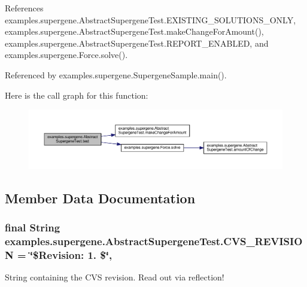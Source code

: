 References examples.\-supergene.\-Abstract\-Supergene\-Test.\-E\-X\-I\-S\-T\-I\-N\-G\-\_\-\-S\-O\-L\-U\-T\-I\-O\-N\-S\-\_\-\-O\-N\-L\-Y, examples.\-supergene.\-Abstract\-Supergene\-Test.\-make\-Change\-For\-Amount(), examples.\-supergene.\-Abstract\-Supergene\-Test.\-R\-E\-P\-O\-R\-T\-\_\-\-E\-N\-A\-B\-L\-E\-D, and examples.\-supergene.\-Force.\-solve().



Referenced by examples.\-supergene.\-Supergene\-Sample.\-main().



Here is the call graph for this function\-:
\nopagebreak
\begin{figure}[H]
\begin{center}
\leavevmode
\includegraphics[width=350pt]{classexamples_1_1supergene_1_1_abstract_supergene_test_a92f6bbeeedeed872a2cb7cb38e6a40c2_cgraph}
\end{center}
\end{figure}




\subsection{Member Data Documentation}
\hypertarget{classexamples_1_1supergene_1_1_abstract_supergene_test_a3bf642196176bfe1e85adea8652098b7}{
\subsubsection[{C\-V\-S\-\_\-\-R\-E\-V\-I\-S\-I\-O\-N}]{\setlength{\rightskip}{0pt plus 5cm}final String examples.\-supergene.\-Abstract\-Supergene\-Test.\-C\-V\-S\-\_\-\-R\-E\-V\-I\-S\-I\-O\-N = \char`\"{}\$Revision\-: 1. \$\char`\"{}\hspace{0.3cm}{\ttfamily [static]}, {\ttfamily [private]}}}\label{classexamples_1_1supergene_1_1_abstract_supergene_test_a3bf642196176bfe1e85adea8652098b7}
String containing the C\-V\-S revision. Read out via reflection! 

